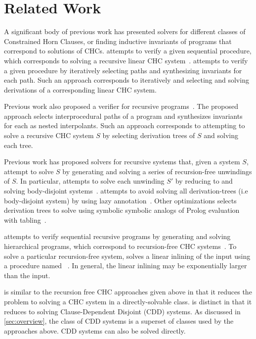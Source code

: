 \section{Related Work}
\label{sec:related-work}
A significant body of previous work has presented solvers for
different classes of Constrained Horn Clauses, or finding inductive
invariants of programs that correspond to solutions of CHCs.
\impact attempts to verify a given sequential procedure, which
corresponds to solving a recursive linear CHC
system~\cite{mcmillan06}.
%
\impact attempts to verify a given procedure by iteratively selecting
paths and synthesizing invariants for each path.
%
Such an approach corresponds to iteratively and selecting and solving
derivations of a corresponding linear CHC system.

Previous work also proposed a verifier for recursive
programs~\cite{heizmann10}.
%
The proposed approach selects interprocedural paths of a program and
synthesizes invariants for each as nested interpolants.
%
Such an approach corresponds to attempting to solve a recursive CHC
system $S$ by selecting derivation trees of $S$
and solving each tree.

Previous work has proposed solvers for recursive systems that, given a
system $S$, attempt to solve $S$ by generating and
solving a series of recursion-free unwindings of $S$.
%
In particular, \eldarica attempts to solve each unwinding
$S'$ by reducing to and solving body-disjoint systems~\cite{rummer13a,rummer13b}.
%
\duality attempts to avoid solving all derivation-trees (i.e
body-disjoint system) by using lazy annotation~\cite{bjorner13}.
%
Other optimizations selects derivation trees to solve using symbolic
symbolic analogs of Prolog evaluation with
tabling~\cite{jaffar09,mcmillan14}.
%

\whale attempts to verify sequential recursive programs by generating
and solving hierarchical programs, which correspond to recursion-free CHC
systems~\cite{albarghouthi12b}.
%
To solve a particular recursion-free system, \whale solves a linear
inlining of the input using a procedure named
\vinta~\cite{albarghouthi12a}.
%
In general, the linear inlining may be exponentially larger than the
input.

\sys is similar to the recursion free CHC approaches given above in
that it reduces the problem to solving a CHC system in a
directly-solvable class.
%
\sys is distinct in that it reduces to solving Clause-Dependent
Disjoint (CDD) systems.
%
As discussed in \autoref{sec:overview}, the class of CDD systems is a
superset of classes used by the approaches above. CDD systems can
also be solved directly.

